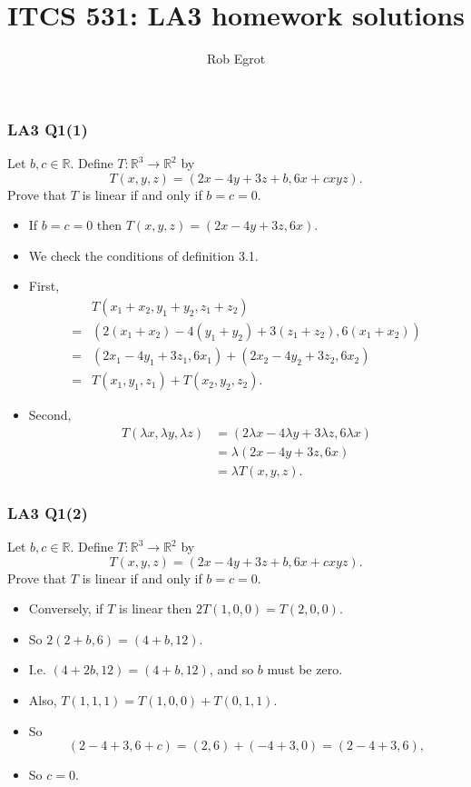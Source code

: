\documentclass[handout]{beamer}
\title{ITCS 531: LA3 homework solutions}
\date{}
\author{Rob Egrot}
\newcommand{\bR}{\mathbb{R}}
\begin{document}
\begin{frame}
\titlepage
\end{frame}

\begin{frame}
\frametitle{LA3 Q1(1)}
Let $b,c\in \bR$. Define $T:\bR^3\to \bR^2$ by 
\[T(x,y,z) = (2x-4y+3z+b, 6x +cxyz).\]
Prove that $T$ is linear if and only if $b=c=0$.
\begin{itemize}
\item If $b=c=0$ then $T(x,y,z) = (2x-4y+3z, 6x)$. 
\item We check the conditions of definition 3.1. 
\item First,
\begin{align*}
&T(x_1 + x_2,y_1+y_2,z_1+z_2)\\
=& (2(x_1+x_2) - 4(y_1+y_2) +3(z_1+z_2), 6(x_1+x_2))\\
=& (2x_1 - 4y_1 +3z_1, 6x_1) + (2x_2 - 4y_2 +3z_2, 6x_2)\\
=& T(x_1,y_1,z_1) + T(x_2,y_2,z_2).
\end{align*} 
\item Second,
\begin{align*}
T(\lambda x, \lambda y, \lambda z) &= (2\lambda x-4\lambda y+3 \lambda z, 6\lambda x)\\
&= \lambda (2 x-4 y+3 z, 6 x)\\
&= \lambda T(x,y,z).
\end{align*}
\end{itemize}
\end{frame}

\begin{frame}
\frametitle{LA3 Q1(2)}
Let $b,c\in \bR$. Define $T:\bR^3\to \bR^2$ by 
\[T(x,y,z) = (2x-4y+3z+b, 6x +cxyz).\]
Prove that $T$ is linear if and only if $b=c=0$.
\begin{itemize}
\item Conversely, if $T$ is linear then $2T(1,0,0) = T(2,0,0)$. 
\item So $2(2+b,6) = (4+b,12)$. 
\item I.e. $(4+2b,12) = (4+b,12)$, and so $b$ must be zero. 
\item Also, $T(1,1,1) = T(1,0,0) + T(0,1,1)$. 
\item So
\[(2-4+3,6 + c) = (2, 6) + (-4+3,0) = (2-4+3,6),\]
\item So $c=0$. 
\end{itemize}
\end{frame}
\end{document}
